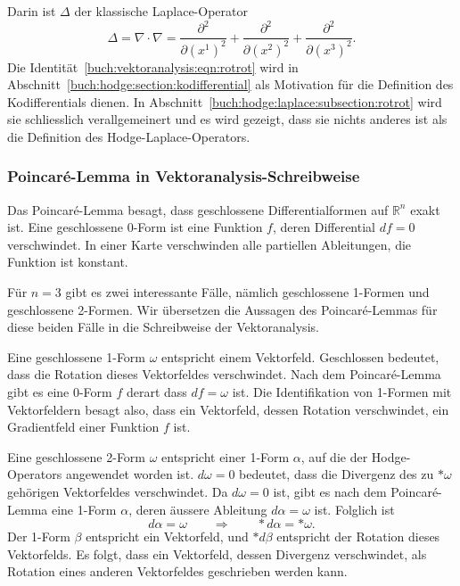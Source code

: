 \egroup
Darin ist $\Delta$ der klassische Laplace-Operator
%
\[
\Delta
=
\nabla\cdot\nabla
=
\frac{\partial^2}{\partial (x^1)^2}
+
\frac{\partial^2}{\partial (x^2)^2}
+
\frac{\partial^2}{\partial (x^3)^2}.
\]
Die Identität~\eqref{buch:vektoranalysis:eqn:rotrot} wird in
Abschnitt~\ref{buch:hodge:section:kodifferential} als Motivation
für die Definition des Kodifferentials dienen.
In Abschnitt~\ref{buch:hodge:laplace:subsection:rotrot} wird sie
schliesslich verallgemeinert und es wird gezeigt, dass sie nichts
anderes ist als die Definition des Hodge-Laplace-Operators.

%
%
\subsubsection{Poincaré-Lemma in Vektoranalysis-Schreibweise}
Das Poincaré-Lemma besagt, dass geschlossene Differentialformen auf
$\mathbb{R}^n$ exakt ist.
Eine geschlossene 0-Form ist eine Funktion $f$, deren Differential
$df=0$ verschwindet.
In einer Karte verschwinden alle partiellen Ableitungen, die Funktion
ist konstant.

Für $n=3$ gibt es zwei interessante Fälle, nämlich geschlossene 1-Formen
und geschlossene 2-Formen.
Wir übersetzen die Aussagen des Poincaré-Lemmas für diese beiden
Fälle in die Schreibweise der Vektoranalysis.

Eine geschlossene 1-Form $\omega$ entspricht einem Vektorfeld.
Geschlossen bedeutet, dass die Rotation dieses Vektorfeldes verschwindet.
Nach dem Poincaré-Lemma gibt es eine 0-Form $f$ derart dass
%
$df=\omega$ ist.
Die Identifikation von 1-Formen mit Vektorfeldern besagt also, dass
ein Vektorfeld, dessen Rotation verschwindet, ein Gradientfeld
einer Funktion $f$ ist.

Eine geschlossene 2-Form $\omega$ entspricht einer 1-Form $\alpha$,
auf die der Hodge-Operators angewendet worden ist.
$d\omega=0$ bedeutet, dass die Divergenz des zu $\ast\omega$
gehörigen Vektorfeldes verschwindet.
Da $d\omega=0$ ist, gibt es nach dem Poincaré-Lemma eine 1-Form $\alpha$,
deren äussere Ableitung $d\alpha=\omega$ ist.
Folglich ist 
\[
d\alpha = \omega
\qquad\Rightarrow\qquad
\ast d\alpha = \ast\omega.
\]
Der 1-Form $\beta$ entspricht ein Vektorfeld, und $\ast d\beta$ entspricht
der Rotation dieses Vektorfelds.
Es folgt, dass ein Vektorfeld, dessen Divergenz verschwindet, als
Rotation eines anderen Vektorfeldes geschrieben werden kann.

